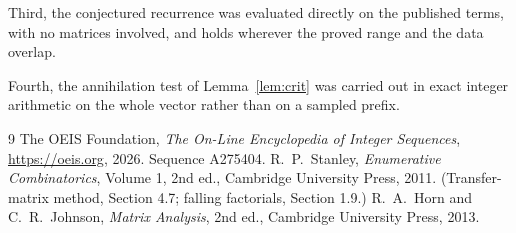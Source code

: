 \documentclass[11pt,a4paper]{article}
\theoremstyle{plain}
\theoremstyle{definition}
\begin{document}
Third, the conjectured recurrence was evaluated directly on the published terms, with no
matrices involved, and holds wherever the proved range and the data overlap.

Fourth, the annihilation test of Lemma~\ref{lem:crit} was carried out in exact integer
arithmetic on the whole vector rather than on a sampled prefix.

\begin{thebibliography}{9}
 The OEIS Foundation, \emph{The On-Line Encyclopedia of Integer
Sequences}, \url{https://oeis.org}, 2026. Sequence A275404.
 R.~P.~Stanley, \emph{Enumerative Combinatorics}, Volume 1, 2nd ed.,
Cambridge University Press, 2011. (Transfer-matrix method, Section 4.7; falling factorials,
Section 1.9.)
 R.~A.~Horn and C.~R.~Johnson, \emph{Matrix Analysis}, 2nd ed., Cambridge
University Press, 2013.
\end{thebibliography}
\end{document}
